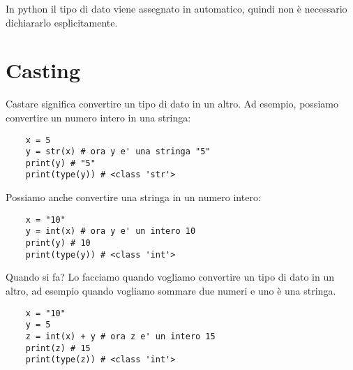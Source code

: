 \documentclass[a4paper,12pt]{article}
\begin{document}
In python il tipo di dato viene assegnato in automatico, quindi non è necessario dichiararlo esplicitamente.
\begin{center}
\end{center}
\newpage

\section{Casting}
Castare significa convertire un tipo di dato in un altro.
Ad esempio, possiamo convertire un numero intero in una stringa:
\begin{lstlisting}
    x = 5
    y = str(x) # ora y e' una stringa "5"
    print(y) # "5"
    print(type(y)) # <class 'str'>
\end{lstlisting}
Possiamo anche convertire una stringa in un numero intero:
\begin{lstlisting}
    x = "10"
    y = int(x) # ora y e' un intero 10
    print(y) # 10
    print(type(y)) # <class 'int'>
\end{lstlisting}
Quando si fa? Lo facciamo quando vogliamo convertire un tipo di dato in un altro, ad esempio quando vogliamo sommare due numeri e uno è una stringa.
\begin{lstlisting}
    x = "10"
    y = 5
    z = int(x) + y # ora z e' un intero 15
    print(z) # 15
    print(type(z)) # <class 'int'>
\end{lstlisting}
\newpage
\end{document}
